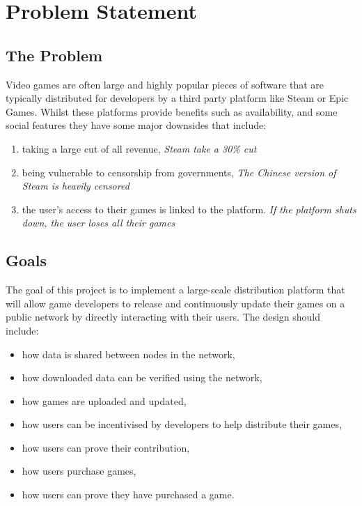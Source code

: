 
\chapter{Problem Statement}

\section{The Problem}
\label{sec:problem}

Video games are often large and highly popular pieces of software that are typically distributed for developers by a third party platform like Steam or Epic Games. Whilst these platforms provide benefits such as availability, and some social features they have some major downsides that include:
\vspace{1mm}
\begin{enumerate}[label=(\alph*)]
  \item taking a large cut of all revenue, \newline\textit{Steam take a 30\% cut~\cite{marks_report_2019,brown_valve_2021}}
  \item being vulnerable to censorship from governments, \newline\textit{The Chinese version of Steam is heavily censored~\cite{steamdb_steam_2021}}
  \item the user's access to their games is linked to the platform. \newline\textit{If the platform shuts down, the user loses all their games}
\end{enumerate}
\vspace{1mm}

\section{Goals}

The goal of this project is to implement a large-scale distribution platform that will allow game developers to release and continuously update their games on a public network by directly interacting with their users. The design should include:
\vspace{1mm}
\begin{itemize}
  \item how data is shared between nodes in the network,
  \item how downloaded data can be verified using the network,
  \item how games are uploaded and updated,
  \item how users can be incentivised by developers to help distribute their games,
  \item how users can prove their contribution,
  \item how users purchase games,
  \item how users can prove they have purchased a game.
\end{itemize}
\vspace{1mm}

